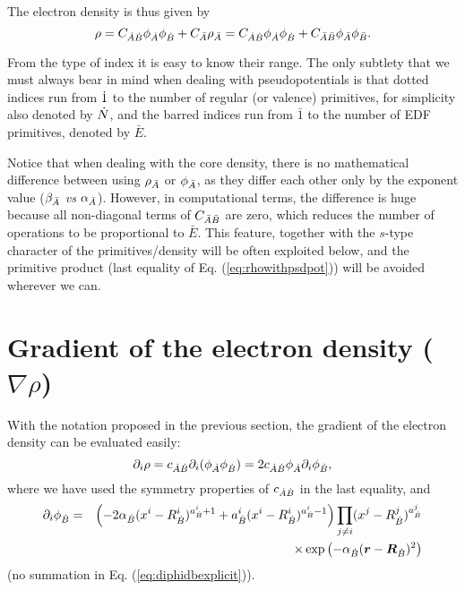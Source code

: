 The electron density is thus given by
%
\begin{equation}\label{eq:rhowithpsdpot}
  \rho=C_{\dot{A}\dot{B}}\phi_{\dot{A}}\phi_{\dot{B}}+C_{\bar{A}}\rho_{\bar{A}}
      =C_{\dot{A}\dot{B}}\phi_{\dot{A}}\phi_{\dot{B}}+C_{\bar{A}\bar{B}}\phi_{\bar{A}}\phi_{\bar{B}}.
\end{equation}
%

From the type of index it is easy to know their range. The only
subtlety that we must always bear in mind when dealing with pseudopotentials is that
dotted indices run from $\dot{1}$ to the number of regular (or valence) primitives,
for simplicity also denoted by $\dot{N}$,
and the barred indices run from $\bar 1$ to the number of EDF primitives,
denoted by $\bar E$.

Notice that when dealing with the core density, there is no mathematical
difference between using $\rho_{\bar{A}}$ or $\phi_{\bar{A}}$, as they differ each
other only by the exponent value ($\beta_{\bar{A}}$ \textit{vs} $\alpha_{\bar{A}}$).
However, in computational terms, the difference is huge because all
non-diagonal terms of $C_{\bar{A}\bar{B}}$ are zero, which reduces the number
of operations to be proportional to $\bar E$. This feature, together with the
$s$-type character of the primitives/density will be often
exploited below, and the primitive product (last equality of Eq.
(\ref{eq:rhowithpsdpot})) will be avoided wherever we can.



\section{Gradient of the electron density ($\nabla\rho$)}\label{sec:gradrho}

With the notation proposed in the previous section, the gradient of the electron density can be evaluated easily:
%
\begin{equation}
   \partial_i\rho=c_{\dot{A}\dot{B}}\partial_i(\phi_{\dot{A}}\phi_{\dot{B}})=2c_{\dot{A}\dot{B}}\phi_{\dot{A}}\partial_i\phi_{\dot{B}},
\end{equation}
%
where we have used the symmetry properties of $c_{\dot{A}\dot{B}}$ in the last equality, and
%
\begin{eqnarray}
   \partial_i\phi_{\dot{B}}&=&\left(-2\alpha_{\dot{B}}(x^i-R^i_{\dot{B}})^{a^i_{\dot{B}}+1}+
   a^i_{\dot{B}}(x^i-R^i_{\dot{B}})^{a^i_{\dot{B}}-1}\right)\prod_{j\neq i}(x^j-R^j_{\dot{B}})^{a^j_{\dot{B}}}\nonumber\\
                       & &\times\exp\left(-\alpha_{\dot{B}}(\boldsymbol{r}-\boldsymbol{R}_{\dot{B}})^2\right)
                       \label{eq:diphidbexplicit}
\end{eqnarray}
%
(no summation in Eq. (\ref{eq:diphidbexplicit})).

